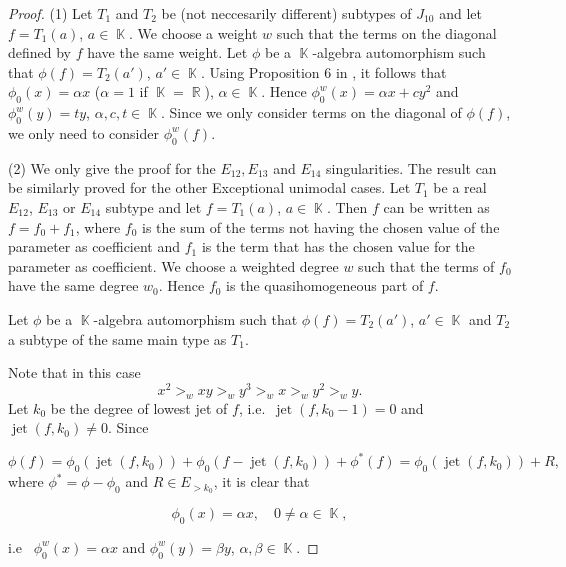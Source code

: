 \documentclass[noend]{amsproc}
\theoremstyle{definition}
\DeclareMathOperator{\R}{\mathbb{R}}
\DeclareMathOperator{\K}{\mathbb{K}}
\DeclareMathOperator{\jet}{jet}
\begin{document}
\begin{proof}

(1) Let $T_1$ and $T_2$ be (not neccesarily different) subtypes of $J_{10}$ and let $f=T_1(a)$, $a\in\K$. We choose a weight $w$ such that the terms on the diagonal defined by $f$ have the same weight. Let $\phi$ be a $\K$-algebra automorphism such that $\phi(f)=T_2(a')$, $a'\in\K$. Using Proposition 6 in \cite{MS2013}, it follows that $\phi_0(x)=\alpha x$ ($\alpha=1$ if $\K=\R$), $\alpha\in\K$. Hence $\phi_0^w(x)=\alpha x+cy^2$ and $\phi_0^w(y)=ty$, $\alpha,c,t\in\K$. Since we only consider terms on the diagonal of $\phi(f)$, we only need to consider $\phi_0^w(f)$.

 (2) We only give the proof for the $E_{12}, E_{13}$ and $E_{14}$ singularities. The result can be similarly proved for the other Exceptional unimodal cases. Let $T_1$ be a real $E_{12}$, $E_{13}$ or $E_{14}$ subtype and let $f=T_1(a)$, $a\in\K$. Then $f$ can be written as $f=f_0+f_1$, where $f_0$ is the sum of the terms not having the chosen value of the parameter as coefficient and $f_1$ is the term that has the chosen value for the parameter as coefficient. We choose a weighted degree $w$ such that the terms of $f_0$ have the same degree $w_0$. Hence $f_0$ is the quasihomogeneous part of $f$.

Let $\phi$ be a $\K$-algebra automorphism such that $\phi(f)=T_2(a')$, $a'\in\K$ and $T_2$ a subtype of the same main type as $T_1$.

Note that in this case
\begin{equation}\label{c}
x^2>_w xy >_w y^3>_w x>_w y^2>_w y.
\end{equation}
Let $k_0$ be the degree of lowest jet of $f$, i.e.~$\jet(f,k_0-1)=0$ and $\jet(f,k_0)\neq 0$. Since 

\begin{equation}
\phi(f) = \phi_0(\jet(f,k_0))+\phi_0(f-\jet(f,k_0))+\phi^*(f)= \phi_0(\jet(f,k_0))+R,\label{lowestjet}
\end{equation}
where $\phi^*=\phi-\phi_0$ and $R\in E_{>k_0}$, it is clear that

\begin{equation}
\phi_0(x)=\alpha x,\quad 0\neq\alpha\in\K,\label{transx}
\end{equation}

i.e~ $\phi_0^{w}(x)=\alpha x$ and $\phi_0^{w}(y)=\beta y$, $\alpha,\beta\in\K$.



\end{proof}
\end{document}
